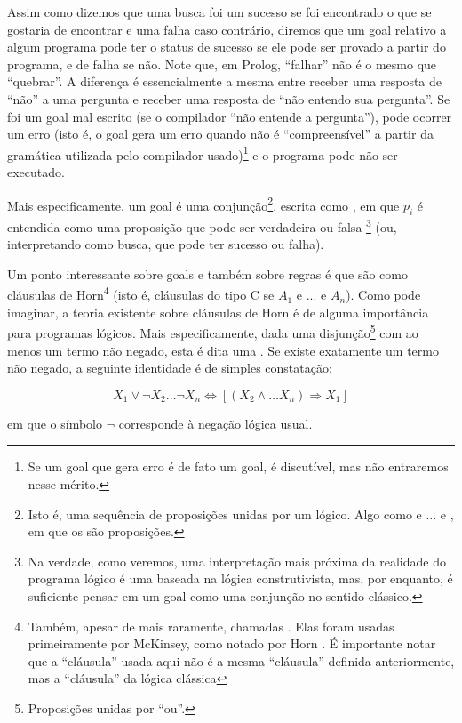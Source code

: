 \documentclass{article}
\begin{document}
Assim como dizemos que uma busca foi um sucesso se foi encontrado o
que se gostaria de encontrar e uma falha caso contrário, diremos que
um goal relativo a algum programa pode ter o status de sucesso se ele
pode ser provado a partir do programa, e de falha se não. Note que, em
Prolog, ``falhar'' não é o mesmo que ``quebrar''. A diferença é
essencialmente a mesma entre receber uma resposta de ``não'' a uma
pergunta e receber uma resposta de ``não entendo sua pergunta''.  Se
foi um goal mal escrito (se o compilador ``não entende a pergunta''),
pode ocorrer um erro (isto é, o goal gera um erro quando não é
``compreensível'' a partir da gramática utilizada pelo compilador
usado)\footnote{Se um goal que gera erro é de fato um goal, é
discutível, mas não entraremos nesse mérito.} e o programa pode não
ser executado.

Mais especificamente, um goal é uma conjunção\footnote{Isto é, uma
sequência de proposições unidas por um  lógico. Algo como
 e ... e , em que os  são
proposições.}, escrita como , em que
$p_i$ é entendida como uma proposição que pode ser verdadeira ou falsa
\footnote{Na verdade, como veremos, uma interpretação mais próxima da
realidade do programa lógico é uma baseada na lógica construtivista,
mas, por enquanto, é suficiente pensar em um goal como uma conjunção
no sentido clássico.} (ou, interpretando como busca, que pode ter
sucesso ou falha).

Um ponto interessante sobre goals e também sobre regras é que são como
cláusulas de Horn\footnote{Também, apesar de mais raramente, chamadas
. Elas foram usadas primeiramente por
McKinsey, como notado por Horn \cite{horn}. É importante notar que a
``cláusula'' usada aqui não é a mesma ``cláusula'' definida
anteriormente, mas a ``cláusula'' da lógica clássica} (isto é,
cláusulas do tipo C se $A_1$ e ... e $A_n$). Como pode imaginar, a
teoria existente sobre cláusulas de Horn é de alguma importância para
programas lógicos. Mais especificamente, dada uma
disjunção\footnote{Proposições unidas por ``ou''.} com ao menos um
termo não negado, esta é dita uma . Se
existe exatamente um termo não negado, a seguinte identidade é de
simples constatação:

\[ X_1 \vee \neg X_2 \hdots \neg X_n \Leftrightarrow [(X_2 \wedge
\hdots X_n) \Rightarrow X_1]
\]

\noindent em que o símbolo $\neg$ corresponde à negação lógica usual.
\end{document}
